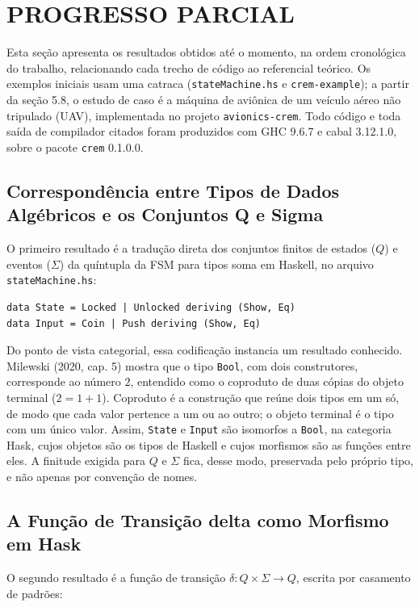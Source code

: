\documentclass[12pt,a4paper]{article}
\begin{document}
\section{PROGRESSO PARCIAL}

Esta seção apresenta os resultados obtidos até o momento, na ordem cronológica do trabalho, relacionando cada trecho de código ao referencial teórico. Os exemplos iniciais usam uma catraca (\texttt{stateMachine.hs} e \texttt{crem-example}); a partir da seção 5.8, o estudo de caso é a máquina de aviônica de um veículo aéreo não tripulado (UAV), implementada no projeto \texttt{avionics-crem}. Todo código e toda saída de compilador citados foram produzidos com GHC 9.6.7 e cabal 3.12.1.0, sobre o pacote \texttt{crem} 0.1.0.0.

\subsection{Correspondência entre Tipos de Dados Algébricos e os Conjuntos Q e Sigma}

O primeiro resultado é a tradução direta dos conjuntos finitos de estados ($Q$) e eventos ($\Sigma$) da quíntupla da FSM para tipos soma em Haskell, no arquivo \texttt{stateMachine.hs}:

\begin{verbatim}
data State = Locked | Unlocked deriving (Show, Eq)
data Input = Coin | Push deriving (Show, Eq)
\end{verbatim}

Do ponto de vista categorial, essa codificação instancia um resultado conhecido. Milewski (2020, cap. 5) mostra que o tipo \texttt{Bool}, com dois construtores, corresponde ao número $2$, entendido como o coproduto de duas cópias do objeto terminal ($2 = 1 + 1$). Coproduto é a construção que reúne dois tipos em um só, de modo que cada valor pertence a um ou ao outro; o objeto terminal é o tipo com um único valor. Assim, \texttt{State} e \texttt{Input} são isomorfos a \texttt{Bool}, na categoria Hask, cujos objetos são os tipos de Haskell e cujos morfismos são as funções entre eles. A finitude exigida para $Q$ e $\Sigma$ fica, desse modo, preservada pelo próprio tipo, e não apenas por convenção de nomes.

\subsection{A Função de Transição delta como Morfismo em Hask}

O segundo resultado é a função de transição $\delta: Q \times \Sigma \to Q$, escrita por casamento de padrões:
\end{document}
